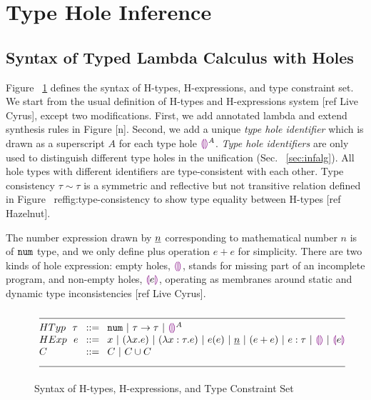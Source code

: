 \section{Type Hole Inference}
\label{sec:typinf}
\subsection{Syntax of Typed Lambda Calculus with Holes}
\label{sec:syntax}

Figure ~\ref{fig:syntax_fig} defines the syntax of H-types, H-expressions, and type constraint set. We start from the usual definition of H-types and H-expressions system [ref Live Cyrus], except two modifications. First, we add annotated lambda and extend synthesis rules in Figure [n]. Second, we add a unique \emph{type hole identifier} which is drawn as a superscript $A$ for each type hole $\textcolor{violet}{\llparenthesis}\textcolor{violet}{\rrparenthesis}^A$. \emph{Type hole identifiers} are only used to distinguish different type holes in the unification (Sec. ~\ref{sec:infalg}). All hole types with different identifiers are type-consistent with each other. Type consistency $\tau \sim \tau$ is a symmetric and reflective but not transitive relation defined in Figure ~ref{fig:type-consistency} to show type equality between H-types [ref Hazelnut]. \par
The number expression drawn by $\underline{n}$ corresponding to mathematical number $n$ is of $\mathtt{num}$ type, and we only define plus operation $e + e$ for simplicity. There are two kinds of hole expression: empty holes, $\textcolor{violet}{\llparenthesis}\textcolor{violet}{\rrparenthesis}$, stands for missing part of an incomplete program, and non-empty holes, $\textcolor{violet}{\llparenthesis} e \textcolor{violet}{\rrparenthesis}$, operating as membranes around static and dynamic type inconsistencies [ref Live Cyrus]. \par
\begin{figure}[htpb]
$\arraycolsep=4pt\begin{array}{lll}
\multicolumn{3}{l}{\hrulefill} \\
HTyp~~ \tau & ::= &
  \tnum ~\vert~
  \tarr{\tau}{\tau} ~\vert~
  \ehole^A
  \\
HExp~~ e & ::= &
  x ~\vert~
  \lamfunc{x}{e} ~\vert~
  \lamfunc{x:\tau}{e} ~\vert~
  e(e) ~\vert~
  \underlinenum{n} ~\vert~
  (e+e) ~\vert~
  e: \tau ~\vert~
  \ehole  ~\vert~
  \notehole{e} \\
C & :: = &
	C ~\vert~
	C \cup C \\
\multicolumn{3}{l}{\hrulefill} 
\end{array}$
\caption{Syntax of H-types, H-expressions, and Type Constraint Set}
\label{fig:syntax_fig}
\end{figure}

